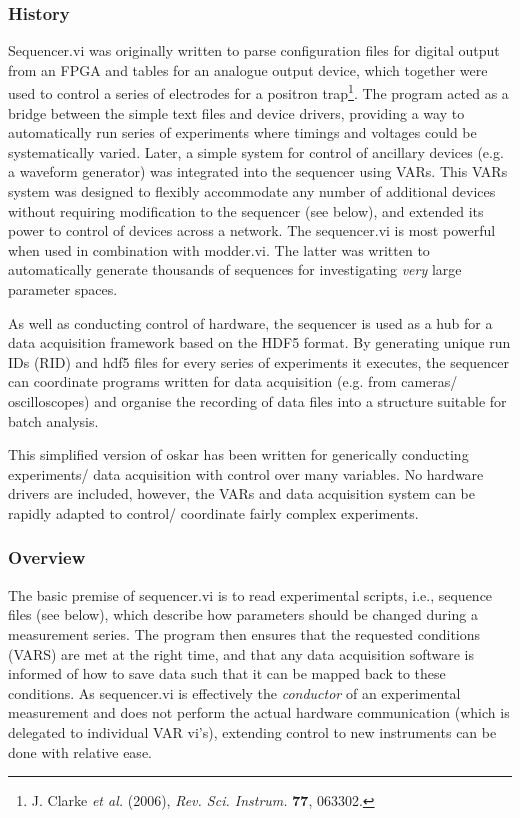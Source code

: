 \documentclass[10pt,a4paper]{article}
\begin{document}
\subsubsection{History}
Sequencer.vi was originally written to parse configuration files for digital output from an FPGA and tables for an analogue output device, which together were used to control a series of electrodes for a positron trap\footnote{J. Clarke \emph{et al.} (2006), \emph{Rev. Sci. Instrum.} \textbf{77}, 063302.}.  The program acted as a bridge between the simple text files and device drivers, providing a way to automatically run series of experiments where timings and voltages could be systematically varied. Later, a simple system for control of ancillary devices (e.g. a waveform generator) was integrated into the sequencer using VARs.    This VARs system was designed to flexibly accommodate any number of additional devices without requiring modification to the sequencer  (see below), and extended its power to control of devices across a network.  The sequencer.vi is most powerful when used in combination with modder.vi.  The latter was written to automatically generate thousands of sequences for investigating \emph{very} large parameter spaces. 

As well as conducting control of hardware, the sequencer is used as a hub for a data acquisition framework based on the HDF5 format.  By generating unique run IDs (RID) and hdf5 files for every series of experiments it executes, the sequencer can coordinate programs written for data acquisition (e.g. from cameras/ oscilloscopes) and organise the recording of data files into a structure suitable for batch analysis.

This simplified version of oskar has been written for generically conducting experiments/ data acquisition with control over many variables.   No hardware drivers are included, however, the VARs and data acquisition system can be rapidly adapted to control/ coordinate fairly complex experiments.

\subsubsection{Overview}

The basic premise of sequencer.vi is to read experimental scripts, i.e., sequence files (see below), which describe how parameters should be changed during a measurement series.  The program then ensures that the requested conditions (VARS) are met at the right time, and that any data acquisition software is informed of how to save data such that it can be mapped back to these conditions.  As sequencer.vi is effectively the \emph{conductor} of an experimental measurement and does not perform the actual hardware communication (which is delegated to individual VAR vi's), extending control to new instruments can be done with relative ease.
\end{document}
